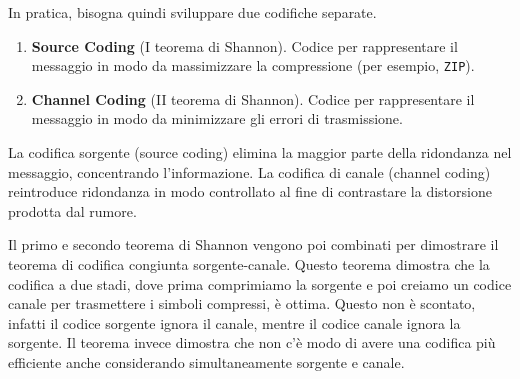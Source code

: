 \documentclass[11pt]{article}
\begin{document}
In pratica, bisogna quindi sviluppare due codifiche separate.
\begin{enumerate}
\item \textbf{Source Coding} (I teorema di Shannon). Codice per rappresentare il messaggio in modo da massimizzare la compressione (per esempio, \texttt{ZIP}).
\item \textbf{Channel Coding} (II teorema di Shannon). Codice per rappresentare il messaggio in modo da minimizzare gli errori di trasmissione.
\end{enumerate}
La codifica sorgente (source coding) elimina la maggior parte della ridondanza nel messaggio, concentrando l'informazione. La codifica di canale (channel coding) reintroduce ridondanza in modo controllato al fine di contrastare la distorsione prodotta dal rumore.

Il primo e secondo teorema di Shannon vengono poi combinati per dimostrare il teorema di codifica congiunta sorgente-canale. Questo teorema dimostra che la codifica a due stadi, dove prima comprimiamo la sorgente e poi creiamo un codice canale per trasmettere i simboli compressi, è ottima. Questo non è scontato, infatti il codice sorgente ignora il canale, mentre il codice canale ignora la sorgente. Il teorema invece dimostra che non c'è modo di avere una codifica più efficiente anche considerando simultaneamente sorgente e canale.
\end{document}
